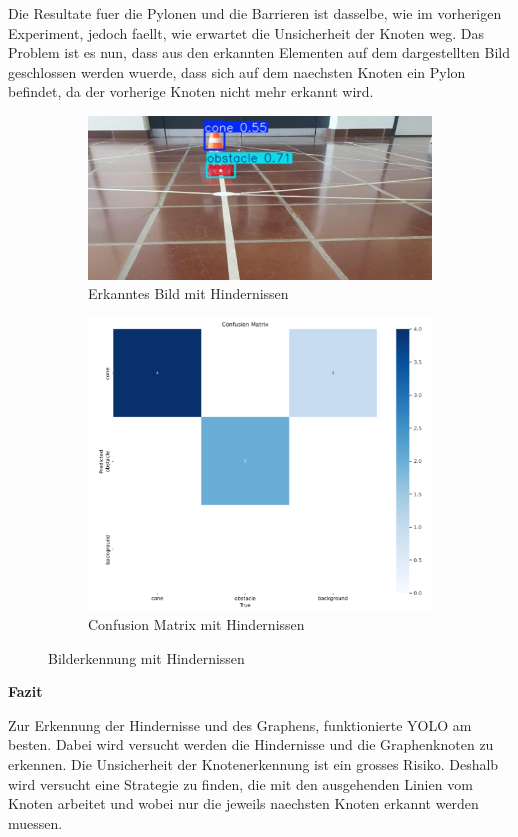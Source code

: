 Die Resultate fuer die Pylonen und die Barrieren ist dasselbe, wie im vorherigen Experiment, jedoch faellt, wie erwartet die Unsicherheit der Knoten weg. Das Problem ist es nun, dass aus den erkannten Elementen auf dem dargestellten Bild geschlossen werden wuerde, dass sich auf dem naechsten Knoten ein Pylon befindet, da der vorherige Knoten nicht mehr erkannt wird.

\begin{figure}[H]
\begin{subfigure}{0.5\textwidth}
\includegraphics[width=0.95\linewidth]{assets/informatik-prototyp/yolo/cone-obst-recognition.png} 
\caption{Erkanntes Bild mit Hindernissen}
\label{fig:image-recognition-with-cone-obst}
\end{subfigure}
\begin{subfigure}{0.5\textwidth}
\includegraphics[width=0.95\linewidth]{assets/informatik-prototyp/yolo/cone-obst-conf-matrix.png} 
\caption{Confusion Matrix mit Hindernissen}
\label{fig:conf-matrix-cone-obst}
\end{subfigure}

\caption{Bilderkennung mit Hindernissen}
\label{fig:recognition-with-cone-obst}
\end{figure}



\textbf{Fazit}

Zur Erkennung der Hindernisse und des Graphens, funktionierte YOLO am besten. Dabei wird versucht werden die Hindernisse und die Graphenknoten zu erkennen. Die Unsicherheit der Knotenerkennung ist ein grosses Risiko. Deshalb wird versucht eine Strategie zu finden, die mit den ausgehenden Linien vom Knoten arbeitet und wobei nur die jeweils naechsten Knoten erkannt werden muessen.